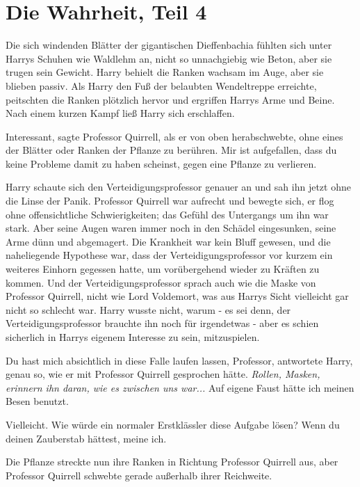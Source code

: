 \chapter{Die Wahrheit, Teil 4}

Die sich windenden Blätter der gigantischen Dieffenbachia fühlten sich unter
Harrys Schuhen wie Waldlehm an, nicht so unnachgiebig wie Beton, aber sie trugen
sein Gewicht. Harry behielt die Ranken wachsam im Auge, aber sie blieben passiv.
Als Harry den Fuß der belaubten Wendeltreppe erreichte, peitschten die Ranken
plötzlich hervor und ergriffen Harrys Arme und Beine. Nach einem kurzen Kampf
ließ Harry sich erschlaffen.

\glqq{}Interessant\grqq{}, sagte Professor Quirrell, als er von oben
herabschwebte, ohne eines der Blätter oder Ranken der Pflanze zu berühren. \glqq{}
Mir ist aufgefallen, dass du keine Probleme damit zu haben scheinst, gegen eine
Pflanze zu verlieren.\grqq{}

Harry schaute sich den Verteidigungsprofessor genauer an und sah ihn jetzt ohne
die Linse der Panik. Professor Quirrell war aufrecht und bewegte sich, er flog
ohne offensichtliche Schwierigkeiten; das Gefühl des Untergangs um ihn war
stark. Aber seine Augen waren immer noch in den Schädel eingesunken, seine Arme
dünn und abgemagert. Die Krankheit war kein Bluff gewesen, und die naheliegende
Hypothese war, dass der Verteidigungsprofessor vor kurzem ein weiteres Einhorn
gegessen hatte, um vorübergehend wieder zu Kräften zu kommen. Und der
Verteidigungsprofessor sprach auch wie die Maske von Professor Quirrell, nicht
wie Lord Voldemort, was aus Harrys Sicht vielleicht gar nicht so schlecht war.
Harry wusste nicht, warum - es sei denn, der Verteidigungsprofessor brauchte ihn
noch für irgendetwas - aber es schien sicherlich in Harrys eigenem Interesse zu
sein, mitzuspielen.

\glqq{}Du hast mich absichtlich in diese Falle laufen lassen, Professor\grqq{},
antwortete Harry, genau so, wie er mit Professor Quirrell gesprochen hätte.
\emph{Rollen, Masken, erinnern ihn daran, wie es zwischen uns war...}
\glqq{}Auf eigene Faust hätte ich meinen Besen benutzt.\grqq{}

\glqq{}Vielleicht. Wie würde ein normaler Erstklässler diese Aufgabe lösen? Wenn
du deinen Zauberstab hättest, meine ich.\grqq{}

Die Pflanze streckte nun ihre Ranken in Richtung Professor Quirrell aus, aber
Professor Quirrell schwebte gerade außerhalb ihrer Reichweite.

